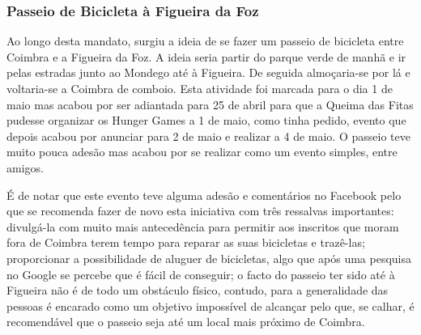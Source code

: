 
\subsubsection{Passeio de Bicicleta à Figueira da Foz}

Ao longo desta mandato, surgiu a ideia de se fazer um passeio de bicicleta entre Coimbra e a Figueira da Foz. A ideia seria partir do parque verde de manhã e ir pelas estradas junto ao Mondego até à Figueira. De seguida almoçaria-se por lá e voltaria-se a Coimbra de comboio. Esta atividade foi marcada para o dia 1 de maio mas acabou por ser adiantada para 25 de abril para que a Queima das Fitas pudesse organizar os Hunger Games a 1 de maio, como tinha pedido, evento que depois acabou por anunciar para 2 de maio e realizar a 4 de maio.
{ %
O passeio teve muito pouca adesão mas acabou por se realizar como um evento simples, entre amigos.
}
{ %
}

É de notar que este evento teve alguma adesão e comentários no Facebook pelo que se recomenda fazer de novo esta iniciativa com três ressalvas importantes: divulgá-la com muito mais antecedência para permitir aos inscritos que moram fora de Coimbra terem tempo para reparar as suas bicicletas e trazê-las; proporcionar a possibilidade de aluguer de bicicletas, algo que após uma pesquisa no Google se percebe que é fácil de conseguir; o facto do passeio ter sido até à Figueira não é de todo um obstáculo físico, contudo, para a generalidade das pessoas é encarado como um objetivo impossível de alcançar pelo que, se calhar, é recomendável que o passeio seja até um local mais próximo de Coimbra.